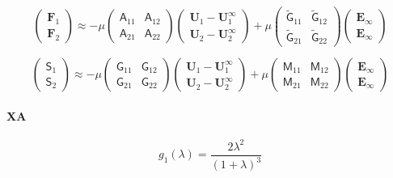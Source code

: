 \documentclass[11pt]{scrartcl}
\newcommand{\tens}[1]{\bm{\mathsf{#1}}}
\begin{document}
\begin{equation}
 \begin{pmatrix}
  \bm{F}_{1} \\
  \bm{F}_{2} 
 \end{pmatrix}
\approx
- \mu
\begin{pmatrix}
\tens{A}_{11} &
\tens{A}_{12}  \\
\tens{A}_{21}  &
\tens{A}_{22}  
\end{pmatrix}
 \begin{pmatrix}
  \bm{U}_{1} -  \bm{U}_{1}^{\infty}\\
  \bm{U}_{2} -  \bm{U}_{2}^{\infty}
 \end{pmatrix}
 + \mu
\begin{pmatrix}
\tilde{\tens{G}}_{11} &
\tilde{\tens{G}}_{12}  \\
\tilde{\tens{G}}_{21}  &
\tilde{\tens{G}}_{22}  
\end{pmatrix}
 \begin{pmatrix}
\bm{E}_{\infty} \\ \bm{E}_{\infty}
\end{pmatrix}
\end{equation}

\begin{equation}
 \begin{pmatrix}
  \tens{S}_{1} \\
  \tens{S}_{2} 
 \end{pmatrix}
\approx
- \mu
\begin{pmatrix}
\tens{G}_{11} &
\tens{G}_{12}  \\
\tens{G}_{21}  &
\tens{G}_{22}  
\end{pmatrix}
 \begin{pmatrix}
  \bm{U}_{1} -  \bm{U}_{1}^{\infty}\\
  \bm{U}_{2} -  \bm{U}_{2}^{\infty}
 \end{pmatrix}
 + \mu
\begin{pmatrix}
\tens{M}_{11} &
\tens{M}_{12}  \\
\tens{M}_{21}  &
\tens{M}_{22}  
\end{pmatrix}
 \begin{pmatrix}
\bm{E}_{\infty} \\ \bm{E}_{\infty}
\end{pmatrix}
\end{equation}


\paragraph{XA}
\begin{equation}
 g_1 (\lambda) = \frac{2\lambda^2}{(1+\lambda)^3}
\end{equation}
\end{document}
